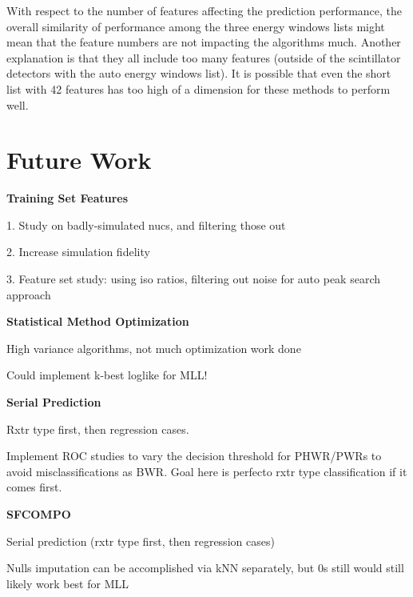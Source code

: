 With respect to the number of features affecting the prediction performance,
the overall similarity of performance among the three energy windows lists
might mean that the feature numbers are not impacting the algorithms much.
Another explanation is that they all include too many features (outside of the
scintillator detectors with the auto energy windows list).  It is possible that
even the short list with 42 features has too high of a dimension for these
methods to perform well. 

\section{Future Work}
\label{sec:future}

\noindent \textbf{Training Set Features}

1. Study on badly-simulated nucs, and filtering those out

2. Increase simulation fidelity

3. Feature set study: using iso ratios, filtering out noise for auto peak search approach

\noindent \textbf{Statistical Method Optimization}

High variance algorithms, not much optimization work done

Could implement k-best loglike for MLL!

\noindent \textbf{Serial Prediction}

Rxtr type first, then regression cases. 

Implement ROC studies to vary the decision threshold for PHWR/PWRs to avoid
misclassifications as BWR. Goal here is perfecto rxtr type classification if
it comes first. 

\noindent \textbf{\gls{SFCOMPO}}

Serial prediction (rxtr type first, then regression cases)

Nulls imputation can be accomplished via kNN separately, but 0s still would
still likely work best for MLL

